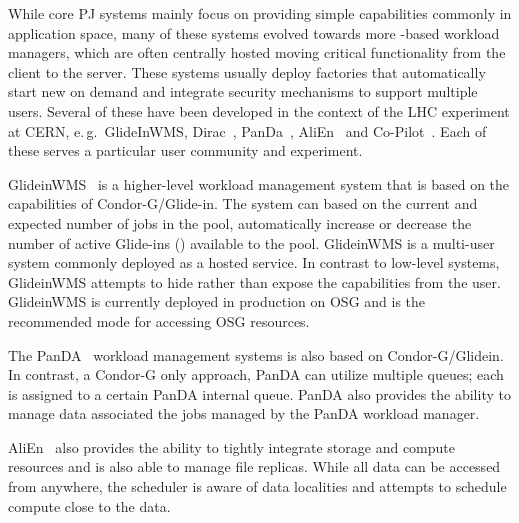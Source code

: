 \documentclass{sig-alternate}
\begin{document}
 

While core PJ systems mainly focus on providing simple \pilot capabilities 
commonly in application space, many of these systems evolved towards more 
\pilot-based workload managers, which are often centrally hosted moving 
critical functionality from the client to the server. These systems usually 
deploy \pilot factories that automatically start new \pilots on demand and 
integrate security mechanisms to support multiple users. Several of these have 
been developed in the context of the LHC experiment at CERN, e.\,g.\ 
GlideInWMS, Dirac~\cite{1742-6596-219-6-062049}, 
PanDa~\cite{1742-6596-331-7-072069}, AliEn~\cite{1742-6596-119-6-062012} and 
Co-Pilot~\cite{copilot-tr}. Each of these \pilots serves a particular user 
community and experiment.

GlideinWMS~\cite{1742-6596-119-6-062044} is a higher-level workload management
system that is based on the \pilot capabilities of Condor-G/Glide-in. The
system can based on the current and expected number of jobs in the pool,
automatically increase or decrease the number of active Glide-ins (\pilots)
available to the pool. GlideinWMS is a multi-user \pilotjob system commonly
deployed as a hosted service. In contrast to low-level \pilotjob systems,
GlideinWMS attempts to hide rather than expose the \pilot capabilities from
the user. GlideinWMS is currently deployed in production on OSG and is the
recommended mode for accessing OSG resources.

The PanDA~\cite{1742-6596-331-7-072069} workload management systems is also 
based on Condor-G/Glidein. In contrast, a Condor-G only approach,
PanDA can utilize multiple queues; each \pilot is assigned to a certain PanDA
internal queue. PanDA also provides the ability to manage data associated the 
jobs managed by the PanDA workload manager.

AliEn~\cite{1742-6596-119-6-062012} also provides the ability to tightly 
integrate storage and compute resources and is also able to manage file 
replicas. While all data can be accessed from anywhere, the scheduler is aware 
of data localities and attempts to schedule compute close to the data.
\end{document}
